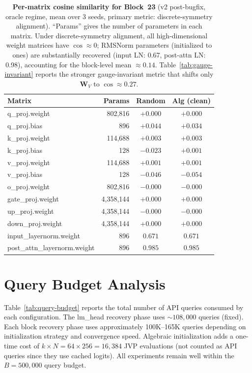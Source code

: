 \documentclass{article}
\newcommand{\bW}{\mathbf{W}}
\begin{document}
\begin{table}[h]
\centering
\caption{\textbf{Per-matrix cosine similarity for Block~23} (v2 post-bugfix, oracle regime, mean over 3 seeds, primary metric: discrete-symmetry alignment).  ``Params'' gives the number of parameters in each matrix.  Under discrete-symmetry alignment, all high-dimensional weight matrices have $\cos \approx 0$; RMSNorm parameters (initialized to ones) are substantially recovered (input LN: 0.67, post-attn LN: 0.98), accounting for the block-level mean $\approx 0.14$.  Table~\ref{tab:gauge-invariant} reports the stronger gauge-invariant metric that shifts only $\bW_V$ to $\cos \approx 0.27$.}
\label{tab:per-matrix}
\small
\begin{tabular}{@{}l r cc@{}}
\toprule
\textbf{Matrix} & \textbf{Params} & \textbf{Random} & \textbf{Alg (clean)} \\
\midrule
q\_proj.weight & 802,816 & $+0.000$ & $+0.000$ \\
q\_proj.bias & 896 & $+0.044$ & $+0.034$ \\
k\_proj.weight & 114,688 & $+0.003$ & $+0.003$ \\
k\_proj.bias & 128 & $-0.023$ & $+0.001$ \\
v\_proj.weight & 114,688 & $+0.001$ & $+0.001$ \\
v\_proj.bias & 128 & $-0.046$ & $-0.054$ \\
o\_proj.weight & 802,816 & $-0.000$ & $-0.000$ \\
gate\_proj.weight & 4,358,144 & $+0.000$ & $+0.000$ \\
up\_proj.weight & 4,358,144 & $-0.000$ & $-0.000$ \\
down\_proj.weight & 4,358,144 & $+0.000$ & $+0.000$ \\
input\_layernorm.weight & 896 & $0.671$ & $0.671$ \\
post\_attn\_layernorm.weight & 896 & $0.985$ & $0.985$ \\
\bottomrule
\end{tabular}
\end{table}


\section{Query Budget Analysis}
\label{app:query-budget}

Table~\ref{tab:query-budget} reports the total number of API queries consumed by each configuration.  The lm\_head recovery phase uses $\sim 108{,}000$ queries (fixed).  Each block recovery phase uses approximately 100K--165K queries depending on initialization strategy and convergence speed.  Algebraic initialization adds a one-time cost of $k \times N = 64 \times 256 = 16{,}384$ JVP evaluations (not counted as API queries since they use cached logits).  All experiments remain well within the $B = 500{,}000$ query budget.
\end{document}
